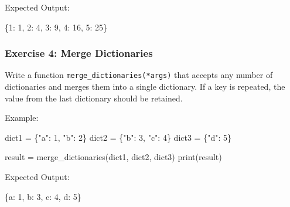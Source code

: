 \documentclass[
  letterpaper,
  DIV=11,
  numbers=noendperiod]{scrreprt}
\newenvironment{Shaded}{\begin{snugshade}}{\end{snugshade}}
\newcommand{\BuiltInTok}[1]{\textcolor[rgb]{0.00,0.23,0.31}{#1}}
\newcommand{\DecValTok}[1]{\textcolor[rgb]{0.68,0.00,0.00}{#1}}
\newcommand{\NormalTok}[1]{\textcolor[rgb]{0.00,0.23,0.31}{#1}}
\newcommand{\OperatorTok}[1]{\textcolor[rgb]{0.37,0.37,0.37}{#1}}
\newcommand{\StringTok}[1]{\textcolor[rgb]{0.13,0.47,0.30}{#1}}
\begin{document}
Expected Output:

\begin{Shaded}
\begin{Highlighting}[]
\NormalTok{\{}\DecValTok{1}\NormalTok{: }\DecValTok{1}\NormalTok{, }\DecValTok{2}\NormalTok{: }\DecValTok{4}\NormalTok{, }\DecValTok{3}\NormalTok{: }\DecValTok{9}\NormalTok{, }\DecValTok{4}\NormalTok{: }\DecValTok{16}\NormalTok{, }\DecValTok{5}\NormalTok{: }\DecValTok{25}\NormalTok{\}}
\end{Highlighting}
\end{Shaded}

\hypertarget{exercise-4-merge-dictionaries}{%
\subsubsection{Exercise 4: Merge
Dictionaries}\label{exercise-4-merge-dictionaries}}

Write a function \texttt{merge\_dictionaries(*args)} that accepts any
number of dictionaries and merges them into a single dictionary. If a
key is repeated, the value from the last dictionary should be retained.

Example:

\begin{Shaded}
\begin{Highlighting}[]
\NormalTok{dict1 }\OperatorTok{=}\NormalTok{ \{}\StringTok{"a"}\NormalTok{: }\DecValTok{1}\NormalTok{, }\StringTok{"b"}\NormalTok{: }\DecValTok{2}\NormalTok{\}}
\NormalTok{dict2 }\OperatorTok{=}\NormalTok{ \{}\StringTok{"b"}\NormalTok{: }\DecValTok{3}\NormalTok{, }\StringTok{"c"}\NormalTok{: }\DecValTok{4}\NormalTok{\}}
\NormalTok{dict3 }\OperatorTok{=}\NormalTok{ \{}\StringTok{"d"}\NormalTok{: }\DecValTok{5}\NormalTok{\}}

\NormalTok{result }\OperatorTok{=}\NormalTok{ merge\_dictionaries(dict1, dict2, dict3)}
\BuiltInTok{print}\NormalTok{(result)}
\end{Highlighting}
\end{Shaded}

Expected Output:

\begin{Shaded}
\begin{Highlighting}[]
\NormalTok{\{}\StringTok{\textquotesingle{}a\textquotesingle{}}\NormalTok{: }\DecValTok{1}\NormalTok{, }\StringTok{\textquotesingle{}b\textquotesingle{}}\NormalTok{: }\DecValTok{3}\NormalTok{, }\StringTok{\textquotesingle{}c\textquotesingle{}}\NormalTok{: }\DecValTok{4}\NormalTok{, }\StringTok{\textquotesingle{}d\textquotesingle{}}\NormalTok{: }\DecValTok{5}\NormalTok{\}}
\end{Highlighting}
\end{Shaded}
\end{document}
